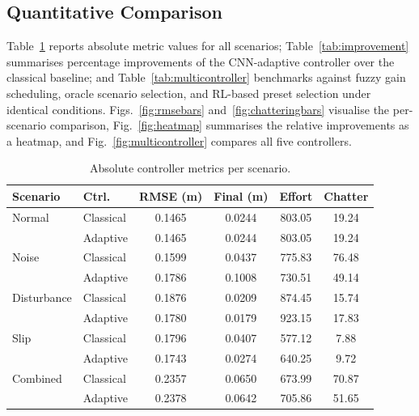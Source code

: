 \documentclass[11pt,a4paper]{article}
\begin{document}
\subsection{Quantitative Comparison}

Table~\ref{tab:absolute} reports absolute metric values for all scenarios;
Table~\ref{tab:improvement} summarises percentage improvements of the CNN-adaptive
controller over the classical baseline; and Table~\ref{tab:multicontroller} benchmarks
against fuzzy gain scheduling, oracle scenario selection, and RL-based preset selection
under identical conditions. Figs.~\ref{fig:rmsebars} and~\ref{fig:chatteringbars}
visualise the per-scenario comparison, Fig.~\ref{fig:heatmap} summarises the relative
improvements as a heatmap, and Fig.~\ref{fig:multicontroller} compares all five
controllers.

\begin{table}[ht]
    \centering
    \caption{Absolute controller metrics per scenario.}
    \label{tab:absolute}
    \begin{tabular}{llcccc}
        \toprule
        \textbf{Scenario} & \textbf{Ctrl.} & \textbf{RMSE (m)} & \textbf{Final (m)} & \textbf{Effort} & \textbf{Chatter} \\
        \midrule
        Normal      & Classical & 0.1465 & 0.0244 & 803.05 & 19.24 \\
                    & Adaptive  & 0.1465 & 0.0244 & 803.05 & 19.24 \\
        \addlinespace
        Noise       & Classical & 0.1599 & 0.0437 & 775.83 & 76.48 \\
                    & Adaptive  & 0.1786 & 0.1008 & 730.51 & 49.14 \\
        \addlinespace
        Disturbance & Classical & 0.1876 & 0.0209 & 874.45 & 15.74 \\
                    & Adaptive  & 0.1780 & 0.0179 & 923.15 & 17.83 \\
        \addlinespace
        Slip        & Classical & 0.1796 & 0.0407 & 577.12 & 7.88  \\
                    & Adaptive  & 0.1743 & 0.0274 & 640.25 & 9.72  \\
        \addlinespace
        Combined    & Classical & 0.2357 & 0.0650 & 673.99 & 70.87 \\
                    & Adaptive  & 0.2378 & 0.0642 & 705.86 & 51.65 \\
        \bottomrule
    \end{tabular}
\end{table}
\end{document}
